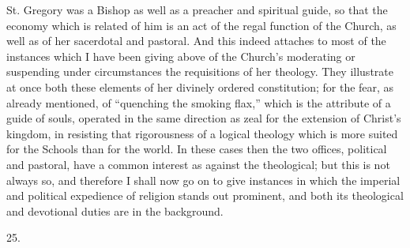 St. Gregory was a Bishop as well as a preacher and spiritual guide,
so that the economy which is related of him is an act of the regal
function of the Church, as well as of her sacerdotal and pastoral. And
this indeed attaches to most of the instances which I have been giving
above of the Church's moderating or suspending under circumstances the
requisitions of her theology. They illustrate at once both these
elements of her divinely ordered constitution; for the fear, as
already mentioned, of ``quenching the smoking flax,'' which is
the attribute of a guide of souls, operated in the same direction as
zeal for the extension of Christ's kingdom, in resisting that
rigorousness of a logical theology which is more suited for the
Schools than for the world. In these cases then the two offices,
political and pastoral, have a common interest as against the
theological; but this is not always so, and therefore I shall now go
on to give instances in which the imperial and political expedience of
religion stands out prominent, and both its theological and devotional
duties are in the background.

25.

